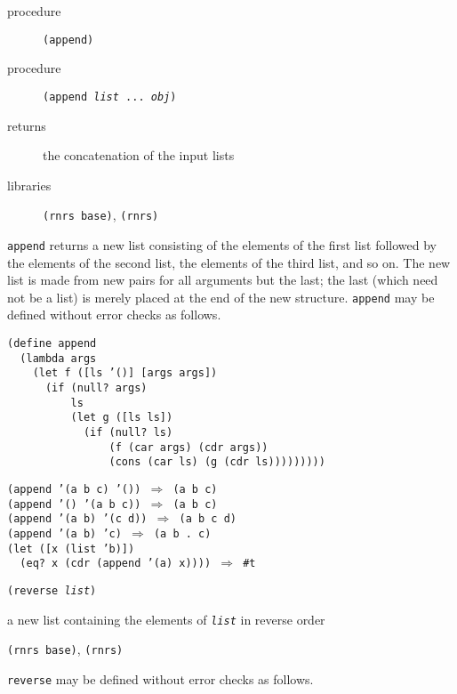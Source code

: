 \begin{description}

\label{objects_s49}\item[procedure] \texttt{(append)}



\item[procedure] \texttt{(append \textit{list} ... \textit{obj})}



\item[returns] the concatenation of the input lists


\item[libraries] \texttt{(rnrs base)}, \texttt{(rnrs)}
\end{description}

\texttt{append} returns a new list consisting of the elements of the first
list followed by the elements of the second list, the elements of the
third list, and so on.
The new list is made from new pairs for all arguments but the last; the
last (which need not be a list) is merely placed at the end of
the new structure.
\texttt{append} may be defined without error checks as follows.

\begin{alltt}
(define append
  (lambda args
    (let f ([ls '()] [args args])
      (if (null? args)
          ls
          (let g ([ls ls])
            (if (null? ls)
                (f (car args) (cdr args))
                (cons (car ls) (g (cdr ls)))))))))

(append '(a b c) '()) \(\Rightarrow\) (a b c)
(append '() '(a b c)) \(\Rightarrow\) (a b c)
(append '(a b) '(c d)) \(\Rightarrow\) (a b c d)
(append '(a b) 'c) \(\Rightarrow\) (a b . c)
(let ([x (list 'b)])
  (eq? x (cdr (append '(a) x)))) \(\Rightarrow\) \#{}t
\end{alltt}

\begin{description}

\label{objects_s50}\item[procedure] \texttt{(reverse \textit{list})}



\item[returns] a new list containing the elements of \texttt{\textit{list}} in reverse order


\item[libraries] \texttt{(rnrs base)}, \texttt{(rnrs)}
\end{description}

\texttt{reverse} may be defined without error checks as follows.

